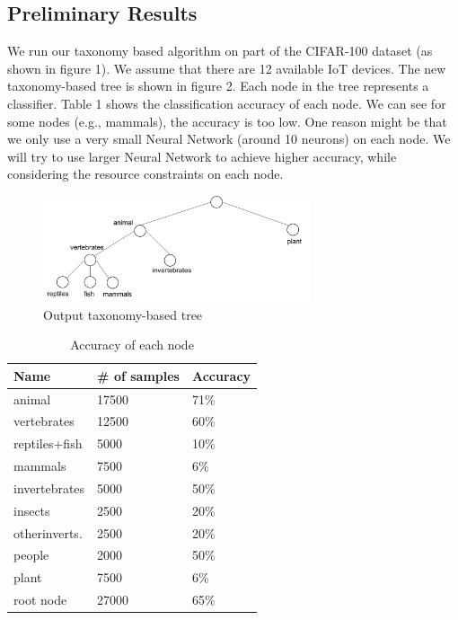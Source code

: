 \documentclass{article}
\begin{document}
\subsection{Preliminary Results}
We run our taxonomy based algorithm on part of the CIFAR-100 dataset (as shown in figure 1). We assume that there are 12 available IoT devices. The new taxonomy-based tree is shown in figure 2. Each node in the tree represents a classifier. Table 1 shows the classification accuracy of each node. We can see for some nodes (e.g., mammals), the accuracy is too low. One reason might be that we only use a very small Neural Network (around 10 neurons) on each node. We will try to use larger Neural Network to achieve higher accuracy, while considering the resource constraints on each node.

\begin{figure}[ht]
  \centering
  \includegraphics[width=0.7\textwidth]{cifar100_after.png}
  \caption{Output taxonomy-based tree}
\end{figure}

\begin{table}[t]
  \caption{Accuracy of each node}
  \label{sample-table}
  \centering
  \begin{tabular}{lll}
    \toprule
    \cmidrule{1-2}
    Name     & \# of samples & Accuracy \\
    \midrule
    animal & 17500 & 71\% \\
    vertebrates & 12500 & 60\% \\
    reptiles+fish & 5000 & 10\% \\
    mammals & 7500 & 6\% \\
    invertebrates & 5000 & 50\% \\
    insects & 2500 & 20\% \\
    otherinverts. & 2500 & 20\% \\
    people & 2000 & 50\% \\ 
    plant & 7500 & 6\% \\ 
    root node & 27000 & 65\% \\
    \bottomrule
  \end{tabular}
\end{table}
\end{document}
